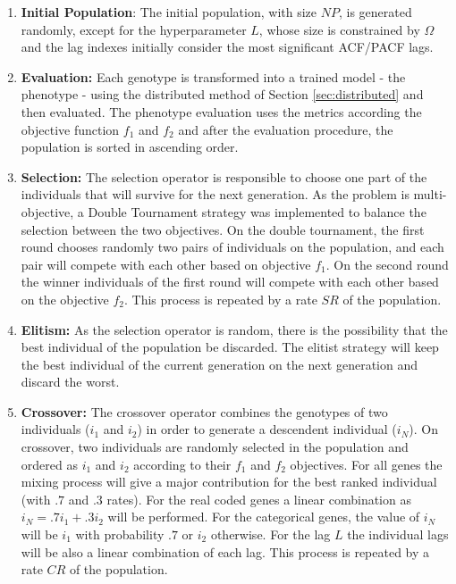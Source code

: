\begin{enumerate}
    \item \textbf{Initial Population}: The initial population, with size $NP$, is generated randomly, except for the hyperparameter $L$, whose size is constrained by $\Omega$ and the lag indexes initially consider the most significant ACF/PACF lags.
    
    \item \textbf{Evaluation:} Each genotype is transformed into a trained model - the phenotype - using the distributed method of Section \ref{sec:distributed} and then evaluated. The phenotype evaluation uses the metrics according the objective function $f_1$ and $f_2$ and after the evaluation procedure, the population is sorted in ascending order.

    \item \textbf{Selection:} The selection operator is responsible to choose one part of the individuals that will survive for the next generation. As the problem is multi-objective, a Double Tournament strategy was implemented to balance the selection between the two objectives. On the double tournament, the first round chooses randomly two pairs of individuals on the population, and each pair will compete with each other based on objective $f_1$. On the second round the winner individuals of the first round will compete with each other based on the objective $f_2$. This process is repeated by a rate $SR$ of the population.
    
    \item \textbf{Elitism:} As the selection operator is random, there is the possibility that the best individual of the population be discarded. The elitist strategy will keep the best individual of the current generation on the next generation and discard the worst.

    \item \textbf{Crossover:} The crossover operator combines the genotypes of two individuals ($i_1$ and $i_2$) in order to generate a descendent individual ($i_N$). On crossover, two individuals are randomly selected in the population and ordered as $i_1$ and $i_2$ according to their $f_1$ and $f_2$ objectives. For all genes the mixing process will give a major contribution for the best ranked individual (with $.7$ and $.3$ rates). For the real coded genes a linear combination as $i_N = .7i_1 + .3i_2$ will be performed. For the categorical genes, the value of $i_N$ will be $i_1$ with probability $.7$ or $i_2$ otherwise. For the lag $L$ the individual lags will be also a linear combination of each lag. This process is repeated by a rate $CR$ of the population.


\end{enumerate}
